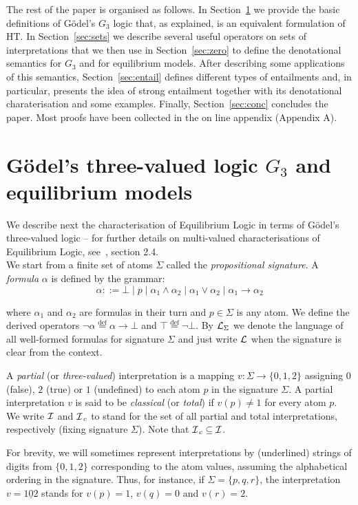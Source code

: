 \documentclass{tlp}
\newcommand{\eqdef}{\mathbin{\stackrel{\mathrm{def}}{=}}}
\def\cI{{\cal I}}
\def\cIc{{\cal I}_{\, c}}
\def\L{{\cal L}}
\newcommand{\str}[1]{\underline{#1}}
\begin{document}
The rest of the paper is organised as follows. In Section~\ref{sec:g3} we provide the basic definitions of G\"odel's $G_3$ logic that, as explained, is an equivalent formulation of HT. In Section~\ref{sec:sets} we describe several useful operators on sets of interpretations that we then use in Section~\ref{sec:zero} to define the denotational semantics for $G_3$ and for equilibrium models. After describing some applications of this semantics, Section~\ref{sec:entail} defines different types of entailments and, in particular, presents the idea of strong entailment together with its denotational charaterisation and some examples. Finally, Section~\ref{sec:conc} concludes the paper. Most proofs have been collected in the on line appendix (Appendix A).

\section{G\"odel's three-valued logic $G_3$ and equilibrium models}
\label{sec:g3}
We describe next the characterisation of Equilibrium Logic in terms of G\"odel's three-valued logic -- for further details on multi-valued characterisations of Equilibrium Logic, see~\cite{Pea06}, section 2.4. \\
We start from a finite set of atoms $\Sigma$ called the \emph{propositional signature}. A \emph{formula} $\alpha$ is defined by the grammar: 
\[
\alpha ::= \bot \mid  p \mid \alpha_1 \wedge \alpha_2 \mid \alpha_1 \vee \alpha_2 \mid \alpha_1 \rightarrow \alpha_2
\]

\noindent where $\alpha_1$ and $\alpha_2$ are formulas in their turn and $p \in \Sigma$ is any atom. We define the derived operators $\neg \alpha \eqdef \alpha \rightarrow \bot$ and $\top \eqdef \neg \bot$. By $\L_{\Sigma}$ we denote the language of all well-formed formulas for signature $\Sigma$ and just write $\L$ when the signature is clear from the context.

A \emph{partial} (or \emph{three-valued}) interpretation is a mapping $v: \Sigma \rightarrow \{0,1,2\}$ assigning $0$ (false), $2$ (true) or $1$ (undefined) to each atom $p$ in the signature $\Sigma$. A partial interpretation $v$ is said to be \emph{classical} (or \emph{total}) if $v(p)\neq 1$ for every atom $p$. We write $\cI$ and $\cIc$ to stand for the set of all partial and total interpretations, respectively (fixing signature $\Sigma$). Note that $\cIc \subseteq \cI$.

For brevity, we will sometimes represent interpretations by (underlined) strings of digits from $\{0,1,2\}$ corresponding to the atom values, assuming the alphabetical ordering in the signature. Thus, for instance, if $\Sigma=\{p,q,r\}$, the interpretation $v=\str{102}$ stands for $v(p)=1$, $v(q)=0$ and $v(r)=2$.
\end{document}
